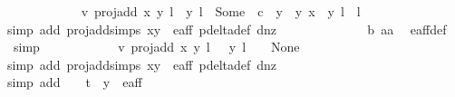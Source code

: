 \begin{isabellebody}
\ \ \ \ \ \ \ \ \ \ \isamarkupfalse%
\ v{}{\isacharcolon}\ {\isachardoublequoteopen}proj{\isacharunderscore}add\ {\isacharparenleft}{\isacharparenleft}x{\isacharcomma}\ y{\isacharparenright}{\isacharcomma}\ l{\isacharparenright}\ {\isacharparenleft}{\isacharparenleft}{}{\isacharcomma}\ y{\isacharprime}{\isacharparenright}{\isacharcomma}\ l{\isacharprime}{\isacharparenright}\ {\isacharequal}\ Some\ {\isacharparenleft}{\isacharparenleft}{\isacharminus}\ {\isacharparenleft}c\ {\isacharasterisk}\ y\ {\isacharasterisk}\ y{\isacharprime}{\isacharparenright}{\isacharcomma}\ x\ {\isacharasterisk}\ y{\isacharprime}{\isacharparenright}{\isacharcomma}\ l\ {\isacharplus}\ l{\isacharprime}{\isacharparenright}{\isachardoublequoteclose}\isanewline
\ \ \ \ \ \ \ \ \ \ \ \ \isamarkupfalse%
{\isacharparenleft}simp\ add{\isacharcolon}\ proj{\isacharunderscore}add{\isachardot}simps\ {\isacartoucheopen}{\isacharparenleft}x{\isacharcomma}y{\isacharparenright}\ {\isasymin}\ e{\isacharunderscore}aff{\isacartoucheclose}\ p{\isacharunderscore}delta{\isacharunderscore}def\ d{\isacharunderscore}{}{\isacharunderscore}nz{\isacharparenright}\isanewline
\ \ \ \ \ \ \ \ \ \ \ \ \isamarkupfalse%
\ b\ aa\ \isamarkupfalse%
\ e{\isacharunderscore}aff{\isacharunderscore}{}{\isacharunderscore}def\ \isamarkupfalse%
\ simp\isanewline
\ \ \ \ \ \ \ \ \ \ \isamarkupfalse%
\ v{}{\isacharcolon}\ {\isachardoublequoteopen}proj{\isacharunderscore}add\ {\isacharparenleft}{\isacharparenleft}x{\isacharcomma}\ y{\isacharparenright}{\isacharcomma}\ l{\isacharparenright}\ {\isacharparenleft}{\isasymtau}\ {\isacharparenleft}{}{\isacharcomma}\ y{\isacharprime}{\isacharparenright}{\isacharcomma}\ l{\isacharprime}\ {\isacharplus}\ {}{\isacharparenright}\ {\isacharequal}\ None{\isachardoublequoteclose}\isanewline
\ \ \ \ \ \ \ \ \ \ \ \ \isamarkupfalse%
{\isacharparenleft}simp\ add{\isacharcolon}\ proj{\isacharunderscore}add{\isachardot}simps\ {\isacartoucheopen}{\isacharparenleft}x{\isacharcomma}y{\isacharparenright}\ {\isasymin}\ e{\isacharunderscore}aff{\isacartoucheclose}\ p{\isacharunderscore}delta{\isacharunderscore}def\ d{\isacharunderscore}{}{\isacharunderscore}nz{\isacharparenright}\isanewline
\ \ \ \ \ \ \ \ \ \ \ \ \isamarkupfalse%
{\isacharparenleft}simp\ add{\isacharcolon}\ {\isacartoucheopen}{\isacharparenleft}{}{\isacharcomma}\ {}\ {\isacharslash}\ {\isacharparenleft}t\ {\isacharasterisk}\ y{\isacharprime}{\isacharparenright}{\isacharparenright}\ {\isasymnotin}\ e{\isacharunderscore}aff{\isacartoucheclose}{\isacharparenright}\isanewline

\end{isabellebody}
